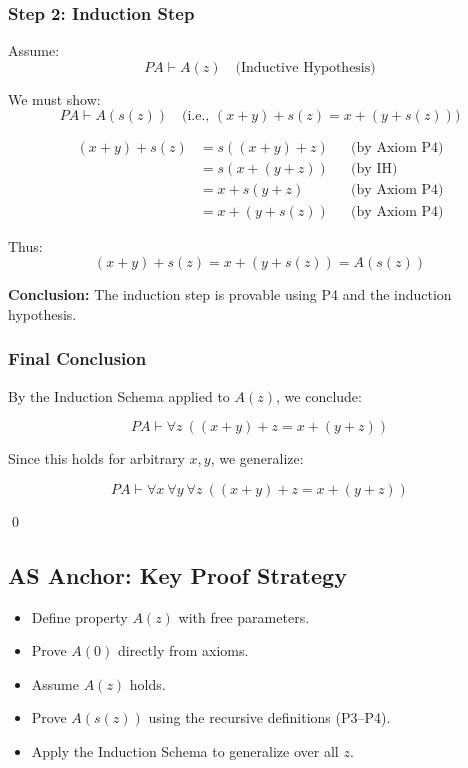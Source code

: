 \documentclass[12pt]{article}
\begin{document}
\subsubsection*{Step 2: Induction Step}

Assume:
\[
PA \vdash A(z) \quad \text{(Inductive Hypothesis)}
\]

We must show:
\[
PA \vdash A(s(z)) \quad \text{(i.e., } (x + y) + s(z) = x + (y + s(z)) \text{)}
\]

\begin{align*}
(x + y) + s(z) &= s((x + y) + z) && \text{(by Axiom P4)} \\
               &= s(x + (y + z)) && \text{(by IH)} \\
               &= x + s(y + z)   && \text{(by Axiom P4)} \\
               &= x + (y + s(z)) && \text{(by Axiom P4)}
\end{align*}

Thus:
\[
(x + y) + s(z) = x + (y + s(z)) = A(s(z))
\]

\textbf{Conclusion:} The induction step is provable using P4 and the induction hypothesis.

\subsubsection*{Final Conclusion}

By the Induction Schema applied to \( A(z) \), we conclude:

\[
PA \vdash \forall z\ ((x + y) + z = x + (y + z))
\]

Since this holds for arbitrary \( x, y \), we generalize:

\[
PA \vdash \forall x\ \forall y\ \forall z\ ((x + y) + z = x + (y + z))
\]

\qed

\subsection*{AS Anchor: Key Proof Strategy}

\begin{itemize}
  \item Define property \( A(z) \) with free parameters.
  \item Prove \( A(0) \) directly from axioms.
  \item Assume \( A(z) \) holds.
  \item Prove \( A(s(z)) \) using the recursive definitions (P3–P4).
  \item Apply the Induction Schema to generalize over all \( z \).
\end{itemize}
\end{document}
